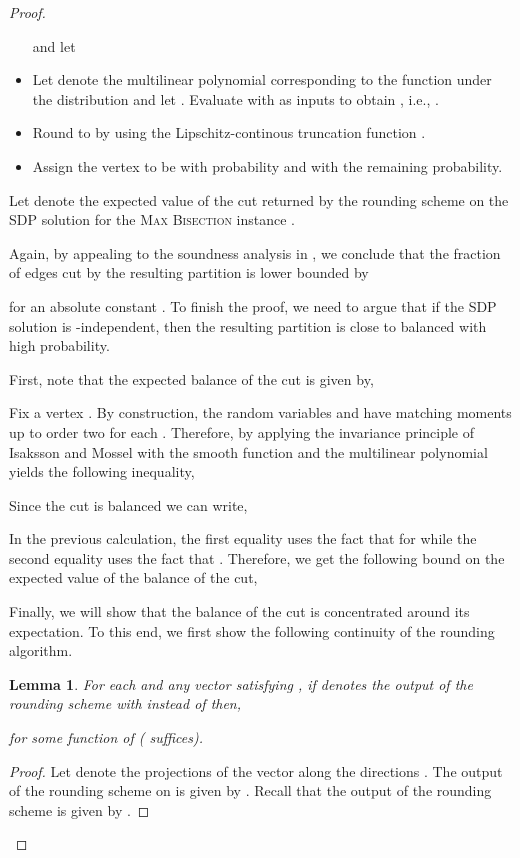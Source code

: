 \documentclass[11pt]{article}
\newtheorem{lemma}[theorem]{Lemma}
\theoremstyle{definition}
\newenvironment{mybox}
{\center \noindent\begin{boxedminipage}{1.0\linewidth}}
{\end{boxedminipage}
\noindent
}
\newcommand{\problemmacro}[1]{\texorpdfstring{\textsc{#1}}{#1}\xspace}
\newcommand{\maxbisection}{\problemmacro{Max Bisection}}
\numberwithin{equation}{section}
\begin{document}
\begin{proof}
\begin{mybox}
\begin{itemize}
	and let 



\item   Let  denote the multilinear polynomial
	corresponding to the function  under the distribution
	 and let .
	Evaluate  with  as
	inputs to obtain , i.e., .
\item 	Round  to  by using the Lipschitz-continous truncation function
	.
	
\item   Assign the vertex  to be  with probability
	       and  with the remaining probability.
      \end{itemize}
 \end{mybox}

  Let  denote the
  expected value of the cut returned by the rounding scheme
 on the SDP solution  for the
\maxbisection instance .

Again, by appealing to the soundness analysis in \cite{Raghavendra08},
we conclude that the fraction of edges cut by the resulting partition
is lower bounded by

for an absolute constant .  To finish the proof, we need to argue that if the SDP solution  is -independent, then the resulting partition is close to
balanced with high probability.

First, note that the expected balance of the cut is given by,


Fix a vertex . By construction, the random variables
 and  have
matching moments up to order two for each .  Therefore, by applying the invariance
principle of Isaksson and Mossel \cite{IsakssonM09} with the smooth
function  and the multilinear polynomial  yields
the following inequality,

Since the cut  is balanced we can write,

In the previous calculation, the first equality uses the fact that  for  while the second equality uses the fact that
.
Therefore, we get the following bound on the expected value of the
balance of the cut, 


Finally, we will show that the balance of the cut is concentrated
around its expectation.  To this end, we first show the following
continuity of the rounding algorithm.

\begin{lemma} \label{lem:rounding-cont}
	For each  and any vector  satisfying
	, if  denotes the output
	of the rounding scheme  with  instead
	of  then,

for some function of  ( suffices).
\end{lemma}
\begin{proof}
	Let  denote the projections of the vector  along
the directions .  The
output of the rounding scheme on  is given by
.  Recall that the output of the rounding scheme is given by .


\end{proof}
\end{proof}
\end{document}
